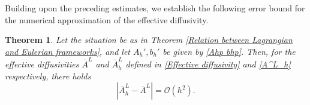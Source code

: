 \documentclass[12pt,a4paper,reqno]{amsart}
\newtheorem{theorem}{Theorem}[section]
\numberwithin{equation}{section}
\begin{document}
Building upon the preceding estimates, we establish the following error bound for the numerical approximation of the effective diffusivity.  

\begin{theorem}\label{Thm: Abar approx}
    Let the situation be as in Theorem \ref{Relation between Lagrangian and Eulerian frameworks}, and let $A_h',b_h'$ be given by \eqref{Ahp bhp}. Then, for the effective diffusivities $\overline{A}^L$ and $\overline{A}^L_h$ defined in \eqref{Effective diffusivity} and \eqref{A^L_h} respectively, there holds 
    \begin{equation*}
        \left\lvert \overline{A}_h^L - \overline{A}^L \right\rvert  = \mathcal{O}(h^2).
    \end{equation*}
\end{theorem}
\end{document}
